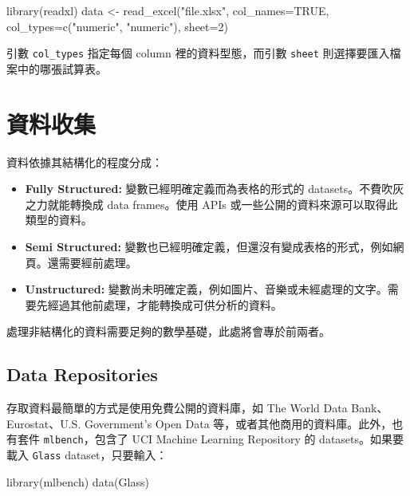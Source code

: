 \documentclass[
]{book}
\newenvironment{Shaded}{\begin{snugshade}}{\end{snugshade}}
\newcommand{\AttributeTok}[1]{\textcolor[rgb]{0.77,0.63,0.00}{#1}}
\newcommand{\ConstantTok}[1]{\textcolor[rgb]{0.00,0.00,0.00}{#1}}
\newcommand{\DecValTok}[1]{\textcolor[rgb]{0.00,0.00,0.81}{#1}}
\newcommand{\FunctionTok}[1]{\textcolor[rgb]{0.00,0.00,0.00}{#1}}
\newcommand{\NormalTok}[1]{#1}
\newcommand{\OtherTok}[1]{\textcolor[rgb]{0.56,0.35,0.01}{#1}}
\newcommand{\StringTok}[1]{\textcolor[rgb]{0.31,0.60,0.02}{#1}}
\theoremstyle{definition}
\theoremstyle{remark}
\begin{document}
\begin{Shaded}
\begin{Highlighting}[]
\FunctionTok{library}\NormalTok{(readxl)}
\NormalTok{data }\OtherTok{\textless{}{-}} \FunctionTok{read\_excel}\NormalTok{(}\StringTok{"file.xlsx"}\NormalTok{, }\AttributeTok{col\_names=}\ConstantTok{TRUE}\NormalTok{, }\AttributeTok{col\_types=}\FunctionTok{c}\NormalTok{(}\StringTok{"numeric"}\NormalTok{, }\StringTok{"numeric"}\NormalTok{), }\AttributeTok{sheet=}\DecValTok{2}\NormalTok{)}
\end{Highlighting}
\end{Shaded}

引數 \texttt{col\_types} 指定每個 column 裡的資料型態，而引數 \texttt{sheet} 則選擇要匯入檔案中的哪張試算表。

\hypertarget{ux8cc7ux6599ux6536ux96c6}{%
\section{資料收集}\label{ux8cc7ux6599ux6536ux96c6}}

資料依據其結構化的程度分成：

\begin{itemize}
\item
  \textbf{Fully Structured:} 變數已經明確定義而為表格的形式的 datasets。不費吹灰之力就能轉換成 data frames。使用 APIs 或一些公開的資料來源可以取得此類型的資料。
\item
  \textbf{Semi Structured:} 變數也已經明確定義，但還沒有變成表格的形式，例如網頁。還需要經前處理。
\item
  \textbf{Unstructured:} 變數尚未明確定義，例如圖片、音樂或未經處理的文字。需要先經過其他前處理，才能轉換成可供分析的資料。
\end{itemize}

處理非結構化的資料需要足夠的數學基礎，此處將會專於前兩者。

\hypertarget{data-repositories}{%
\subsection{Data Repositories}\label{data-repositories}}

存取資料最簡單的方式是使用免費公開的資料庫，如 The World Data Bank、Eurostat、U.S. Government's Open Data 等，或者其他商用的資料庫。此外，也有套件 \texttt{mlbench}，包含了 UCI Machine Learning Repository 的 datasets。如果要載入 \texttt{Glass} dataset，只要輸入：

\begin{Shaded}
\begin{Highlighting}[]
\FunctionTok{library}\NormalTok{(mlbench)}
\FunctionTok{data}\NormalTok{(Glass)}
\end{Highlighting}
\end{Shaded}
\end{document}
